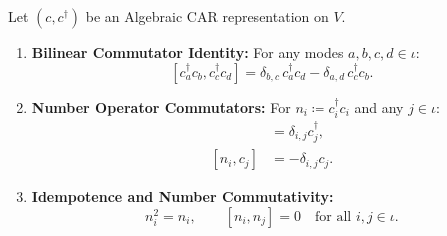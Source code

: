 \begin{theorem}
\label{thm:algebraic_car}
Let $(c, c^\dagger)$ be an Algebraic CAR representation on $V$.
\begin{enumerate}
    \item \textbf{Bilinear Commutator Identity:} For any modes $a, b, c, d \in \iota$:
    \begin{equation}
    \left[ c_a^\dagger c_b, c_c^\dagger c_d \right] = \delta_{b, c}\, c_a^\dagger c_d - \delta_{a, d}\, c_c^\dagger c_b.
    \end{equation}
    \item \textbf{Number Operator Commutators:} For $n_i \coloneqq c_i^\dagger c_i$ and any $j \in \iota$:
    \begin{align}
    [n_i, c_j^\dagger] &= \delta_{i, j} c_j^\dagger, \\
    [n_i, c_j] &= -\delta_{i, j} c_j.
    \end{align}
    \item \textbf{Idempotence and Number Commutativity:}
    \begin{equation}
    n_i^2 = n_i, \qquad [n_i, n_j] = 0 \quad \text{for all } i, j \in \iota.
    \end{equation}
\end{enumerate}
\end{theorem}

